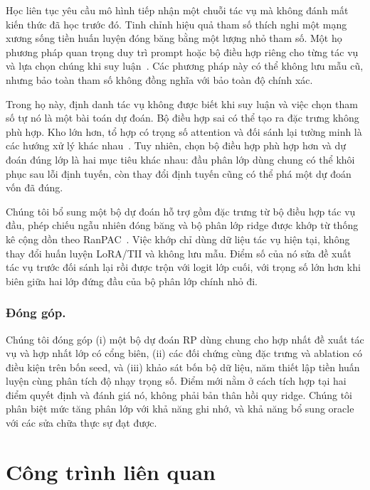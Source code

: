 \documentclass[runningheads]{llncs}
\begin{document}
Học liên tục yêu cầu mô hình tiếp nhận một chuỗi tác vụ mà không đánh mất kiến
thức đã học trước đó. Tinh chỉnh hiệu quả tham số thích nghi một mạng xương sống
tiền huấn luyện đóng băng bằng một lượng nhỏ tham số. Một họ phương pháp quan
trọng duy trì prompt hoặc bộ điều hợp riêng cho từng tác vụ và lựa chọn chúng
khi suy luận~\cite{ref_dualprompt,ref_hide}. Các phương pháp này có thể không
lưu mẫu cũ, nhưng bảo toàn tham số không đồng nghĩa với bảo toàn độ chính xác.

Trong họ này, định danh tác vụ không được biết khi suy luận và việc chọn tham
số tự nó là một bài toán dự đoán. Bộ điều hợp sai có thể tạo ra đặc trưng không
phù hợp. Kho lớn hơn, tổ hợp có trọng số attention và đối sánh lại tường minh
là các hướng xử lý khác nhau~\cite{ref_l2p,ref_coda,ref_hrmpet}. Tuy nhiên,
chọn bộ điều hợp phù hợp hơn và dự đoán đúng lớp là hai mục tiêu khác nhau:
đầu phân lớp dùng chung có thể khôi phục sau lỗi định tuyến, còn thay đổi định
tuyến cũng có thể phá một dự đoán vốn đã đúng.

Chúng tôi bổ sung một bộ dự đoán hỗ trợ gồm đặc trưng từ bộ điều hợp tác vụ đầu,
phép chiếu ngẫu nhiên đóng băng và bộ phân lớp ridge được khớp từ thống kê cộng
dồn theo RanPAC~\cite{ref_ranpac}. Việc khớp chỉ dùng dữ liệu tác vụ hiện tại,
không thay đổi huấn luyện LoRA/TII và không lưu mẫu. Điểm số của nó sửa đề xuất
tác vụ trước đối sánh lại rồi được trộn với logit lớp cuối, với trọng số lớn hơn
khi biên giữa hai lớp đứng đầu của bộ phân lớp chính nhỏ đi.

\subsubsection{Đóng góp.}
Chúng tôi đóng góp (i) một bộ dự đoán RP dùng chung cho hợp nhất đề xuất tác vụ
và hợp nhất lớp có cổng biên, (ii) các đối chứng cùng đặc trưng và ablation có
điều kiện trên bốn seed, và (iii) khảo sát bốn bộ dữ liệu, năm thiết lập tiền
huấn luyện cùng phân tích độ nhạy trọng số. Điểm mới nằm ở cách tích hợp tại hai
điểm quyết định và đánh giá nó, không phải bản thân hồi quy ridge. Chúng tôi
phân biệt mức tăng phân lớp với khả năng ghi nhớ, và khả năng bổ sung oracle
với các sửa chữa thực sự đạt được.

\section{Công trình liên quan}
\label{sec:related}
\end{document}
